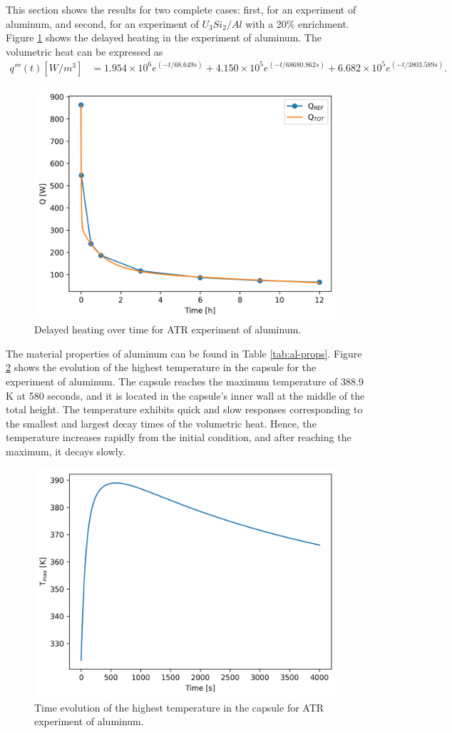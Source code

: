 This section shows the results for two complete cases: first, for an experiment of aluminum, and second, for an experiment of $U_3Si_2/Al$ with a 20\% enrichment.
Figure \ref{fig:modes-atr-1b} shows the delayed heating in the experiment of aluminum.
The volumetric heat can be expressed as
\begin{align}
q'''(t) [W/m^3] &= 1.954 \times 10^6 e^{(-t/68.649 s)} + 4.150 \times 10^5 e^{(-t/68680.862 s)} + 6.682 \times 10^5 e^{(-t/3803.589 s)}.
\end{align}


\begin{figure}[htbp!] %
    \centering
    \includegraphics[width=0.45\linewidth]{figures/atr-13-deco-1}
    \hfill
    \caption{Delayed heating over time for ATR experiment of aluminum.}
    \label{fig:modes-atr-1b}
\end{figure}

The material properties of aluminum can be found in Table \ref{tab:al-props}.
Figure \ref{fig:atr-al} shows the evolution of the highest temperature in the capsule for the experiment of aluminum.
The capsule reaches the maximum temperature of 388.9 K at 580 seconds, and it is located in the capsule's inner wall at the middle of the total height.
The temperature exhibits quick and slow responses corresponding to the smallest and largest decay times of the volumetric heat.
Hence, the temperature increases rapidly from the initial condition, and after reaching the maximum, it decays slowly.

\begin{figure}[htbp!] %
    \centering
    \includegraphics[width=0.45\linewidth]{figures/atr-Al}
    \hfill
    \caption{Time evolution of the highest temperature in the capsule for ATR experiment of aluminum.}
    \label{fig:atr-al}
\end{figure}

